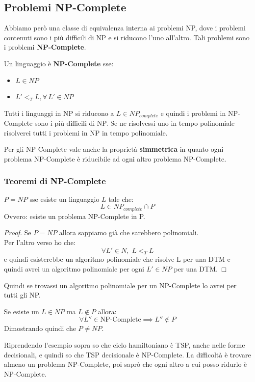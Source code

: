 \subsection{Problemi NP-Complete}
Abbiamo però una classe di equivalenza interna ai problemi NP, dove i problemi
contenuti sono i più difficili di NP e si riducono l'uno all'altro. Tali
problemi sono i problemi \textbf{NP-Complete}.
\begin{definizione}
  Un linguaggio è \textbf{NP-Complete} sse:
  \begin{itemize}
    \item $L\in NP$
    \item $L'<_TL,\forall\,L'\in NP$
  \end{itemize}
  Tutti i linguaggi in NP si riducono a $L\in NP_{complete}$ e quindi i problemi in NP-Complete sono i più difficili di NP.
  Se ne risolvessi uno in tempo polinomiale risolverei tutti i problemi in NP in
  tempo polinomiale.
\end{definizione}
\begin{definizione}
  Per gli NP-Complete vale anche la proprietà \textbf{simmetrica} in quanto ogni problema NP-Complete è riducibile ad ogni altro problema NP-Complete.
\end{definizione}
\subsubsection{Teoremi di NP-Complete}
\begin{definizione}
  $P=NP$ sse esiste un linguaggio $L$ tale che:
  \[L\in NP_{complete}\cap P\]
  Ovvero: esiste un problema NP-Complete in P.
\end{definizione}
\begin{proof}
  Se $P=NP$ allora sappiamo già che sarebbero polinomiali.\\
  Per l'altro verso ho che:
  \[\forall L'\in N, \,\,L<_T L\]
  e quindi esisterebbe un algoritmo polinomiale che risolve L per una DTM e
  quindi avrei un algoritmo polinomiale per ogni $L'\in NP$ per una DTM.
\end{proof}
Quindi se trovassi un algoritmo polinomiale per un NP-Complete lo avrei per
tutti gli NP.
\begin{definizione}
  Se esiste un $L\in NP$ ma $L\not\in P$ allora:
  \[\forall L''\in \mbox{NP-Complete}\implies L''\not\in P \]
Dimostrando quindi che $P\neq NP$.\\
\end{definizione}

Riprendendo l'esempio sopra so
che ciclo hamiltoniano è TSP, anche nelle forme decisionali, e quindi so che TSP
decisionale è NP-Complete. La difficoltà è trovare almeno un problema
NP-Complete, poi saprò che ogni altro a cui posso ridurlo è NP-Complete.\\
